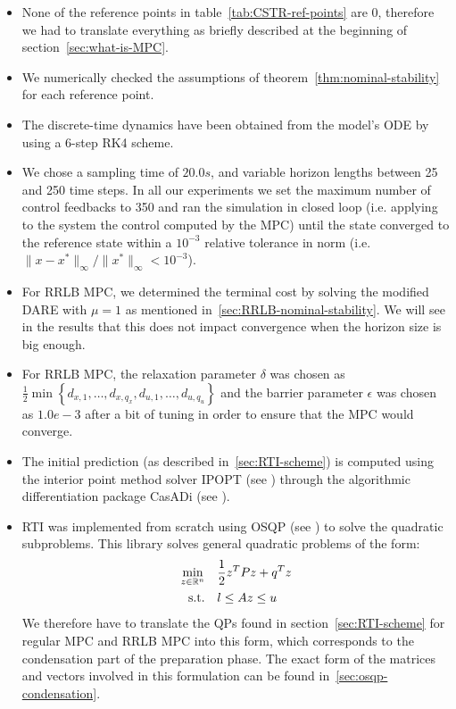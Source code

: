 \documentclass[12pt]{article}
\begin{document}
\begin{itemize}[label=\textbullet]
	\item None of the reference points in table~\ref{tab:CSTR-ref-points} are 0, therefore we had to translate everything as briefly described at the beginning of section~\ref{sec:what-is-MPC}.

	\item We numerically checked the assumptions of theorem~\ref{thm:nominal-stability} for each reference point.

	\item The discrete-time dynamics have been obtained from the model's ODE by using a 6-step RK4 scheme.

	\item We chose a sampling time of $20.0s$, and variable horizon lengths between 25 and 250 time steps.
	In all our experiments we set the maximum number of control feedbacks to 350 and ran the simulation in closed loop (i.e. applying to the system the control computed by the MPC) until the state converged to the reference state within a $10^{-3}$ relative tolerance in norm (i.e. $\|x-x^*\|_\infty/\|x^*\|_\infty<10^{-3}$).

	\item For RRLB MPC, we determined the terminal cost by solving the modified DARE with $\mu=1$ as mentioned in~\ref{sec:RRLB-nominal-stability}.
	We will see in the results that this does not impact convergence when the horizon size is big enough.

	\item For RRLB MPC, the relaxation parameter $\delta$ was chosen as $\frac{1}{2}\min\left\{ d_{x,1},\ldots, d_{x,q_x},d_{u,1},\ldots,d_{u,q_u} \right\}$ and the barrier parameter $\epsilon$ was chosen as $1.0e-3$ after a bit of tuning in order to ensure that the MPC would converge.

	\item The initial prediction (as described in~\ref{sec:RTI-scheme}) is computed using the interior point method solver IPOPT (see \cite{ipopt}) through the algorithmic differentiation package CasADi (see \cite{casadi}).

	\item RTI was implemented from scratch using OSQP (see \cite{osqp}) to solve the quadratic subproblems.
	This library solves general quadratic problems of the form:
	\begin{align*}
		\underset{z\in\mathbb{R}^n}{\min}&\quad\frac{1}{2}z^TPz+q^Tz\\
		\text{s.t.}&\quad l\leq Az\leq u
	\end{align*}
	We therefore have to translate the QPs found in section~\ref{sec:RTI-scheme} for regular MPC and RRLB MPC into this form, which corresponds to the condensation part of the preparation phase.
	The exact form of the matrices and vectors involved in this formulation can be found in~\ref{sec:osqp-condensation}.


\end{itemize}
\end{document}
